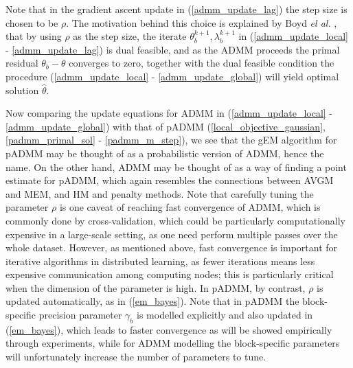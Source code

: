 \documentclass{article}
\newcommand{\1}[0]{\ensuremath{\boldsymbol{1}}\xspace}
\begin{document}
Note that in the gradient ascent update in (\ref{admm_update_lag}) the step size is chosen to be $\rho$. The motivation behind this choice is explained by Boyd \emph{el al.} , that by using $\rho$ as the step size, the iterate
$\theta_b^{k+1}, \lambda_b^{k+1}$ in (\ref{admm_update_local} - \ref{admm_update_lag}) is dual feasible, and as the ADMM proceeds the primal residual $\theta_b -\theta$ converges to zero, together with the dual feasible condition the procedure (\ref{admm_update_local} - \ref{admm_update_global}) will yield optimal solution $\hat\theta$. 

Now comparing the update equations for ADMM in (\ref{admm_update_local} - \ref{admm_update_global}) with that of pADMM (\ref{local_objective_gaussian}, \ref{padmm_primal_sol} - \ref{padmm_m_step}), we see that the gEM algorithm for pADMM may be thought of as a probabilistic version of ADMM, hence the name. On the other hand, ADMM may be thought of as a way of finding a point estimate for pADMM, which again resembles the connections between AVGM and MEM, and HM and penalty methods. Note that carefully tuning the parameter $\rho$ is one caveat of reaching fast convergence of ADMM, which is commonly done by cross-validation, which could be particularly computationally expensive in a large-scale setting, as one need perform multiple passes over the whole dataset. However, as mentioned above, fast convergence is important for iterative algorithms in distributed learning, as fewer iterations means less expensive communication among computing nodes; this is particularly critical when the dimension of the parameter is high. In pADMM, by contrast, $\rho$ is updated automatically, as in (\ref{em_bayes}). Note that in pADMM the block-specific precision parameter $\gamma_b$ is modelled explicitly and also updated in (\ref{em_bayes}), which leads to faster convergence as will be showed empirically through experiments, while for ADMM modelling the block-specific parameters will unfortunately increase the number of parameters to tune.
\end{document}
